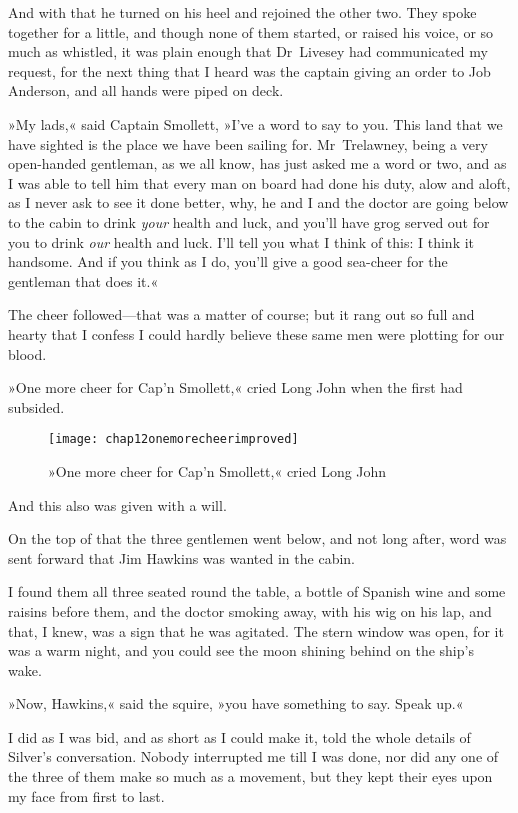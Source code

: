 And with that he turned on his heel and rejoined the other two. They spoke together for a little, and though none of them started, or raised his voice, or so much as whistled, it was plain enough that Dr~Livesey had communicated my request, for the next thing that I heard was the captain giving an order to Job Anderson, and all hands were piped on deck.

»My lads,« said Captain Smollett, »I've a word to say to you. This land that we have sighted is the place we have been sailing for. Mr~Trelawney, being a very open-handed gentleman, as we all know, has just asked me a word or two, and as I was able to tell him that every man on board had done his duty, alow and aloft, as I never ask to see it done better, why, he and I and the doctor are going below to the cabin to drink \textit{your} health and luck, and you'll have grog served out for you to drink \textit{our} health and luck. I'll tell you what I think of this: I think it handsome. And if you think as I do, you'll give a good sea-cheer for the gentleman that does it.«

The cheer followed—that was a matter of course; but it rang out so full and hearty that I confess I could hardly believe these same men were plotting for our blood.

»One more cheer for Cap'n Smollett,« cried Long John when the first had subsided.

 \begin{sidewaysfigure}
\texttt{[image: chap12onemorecheerimproved]}%
\caption{»One more cheer for Cap'n Smollett,« cried Long John}
\end{sidewaysfigure} 

And this also was given with a will.

On the top of that the three gentlemen went below, and not long after, word was sent forward that Jim Hawkins was wanted in the cabin.

I found them all three seated round the table, a bottle of Spanish wine and some raisins before them, and the doctor smoking away, with his wig on his lap, and that, I knew, was a sign that he was agitated. The stern window was open, for it was a warm night, and you could see the moon shining behind on the ship's wake.

»Now, Hawkins,« said the squire, »you have something to say. Speak up.«

I did as I was bid, and as short as I could make it, told the whole details of Silver's conversation. Nobody interrupted me till I was done, nor did any one of the three of them make so much as a movement, but they kept their eyes upon my face from first to last.

